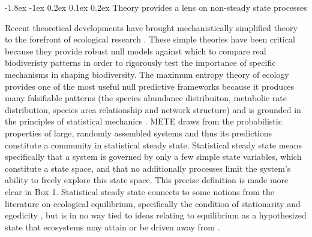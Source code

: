 \documentclass[11pt]{article}
\makeatletter
\renewcommand\subsection{\@startsection{subsection}{1}{\z@}%
                                  {-1.8ex \@plus -1ex \@minus 0.2ex}%
                                  {0.1ex \@plus 0.2ex}%
                                  {\normalfont\large\bfseries}}
\makeatother
\begin{document}
\subsection{Theory provides a lens on non-steady state processes}

Recent theoretical developments have brought mechanistically
simplified theory to the forefront of ecological research
\citep{hubbell2001, chave, rosindell, harte2011}.  These simple
theories have been critical because they provide robust null models
against which to compare real biodiveristy patterns in order to
rigorously test the importance of specific mechanisms in shaping
biodiversity.  The maximum entropy theory of ecology
\citep[METE][]{harte2011} provides one of the most useful null
predictive frameworks because it produces many falsifiable patterns
(the species abundance distribuiton, metabolic rate distribution,
species area relationship and network structure) and is grounded in
the principles of statistical mechanics \citep{harte2011, jaynes}.
METE draws from the probabilistic properties of large, randomly
assembled systems \citep{harte2011} and thus its predictions
constitute a community in statistical steady state.  Statistical
steady state means specifically that a system is governed by only a
few simple state variables, which constitute a state space, and that
no additionally processes limit the system’s ability to freely explore
this state space.  This precise definition is made more clear in Box
1.  Statistical steady state connects to some notions from the
literature on ecological equilibrium, specifically the condition of
stationarity \citep{chesson} and egodicity \citep{maurer}, but is in
no way tied \citep{harte2011} to ideas relating to equilibrium as a
hypothesized state that ecosystems may attain or be driven away from
\citep{}.
\end{document}
